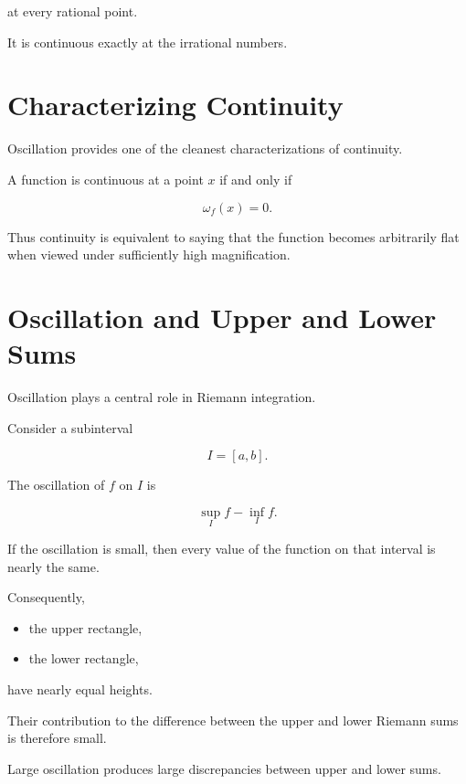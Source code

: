 \documentclass{essay}
\begin{document}
at every rational point.

It is continuous exactly at the irrational numbers.


\section{Characterizing Continuity}

Oscillation provides one of the cleanest characterizations of continuity.

\begin{theorem}

  A function is continuous at a point \(x\) if and only if

  \[ \omega_{f}(x)=0. \]

\end{theorem}

Thus continuity is equivalent to saying that the function becomes arbitrarily
flat when viewed under sufficiently high magnification.


\section{Oscillation and Upper and Lower Sums}

Oscillation plays a central role in Riemann integration.

Consider a subinterval

\[ I=[a,b]. \]

The oscillation of \(f\) on \(I\) is

\[ \sup_{I} f-\inf_{I} f. \]

If the oscillation is small, then every value of the function on that interval
is nearly the same.

Consequently,

\begin{itemize}
  \item the upper rectangle,
  \item the lower rectangle,
\end{itemize}

have nearly equal heights.

Their contribution to the difference between the upper and lower Riemann sums is
therefore small.

Large oscillation produces large discrepancies between upper and lower sums.
\end{document}
